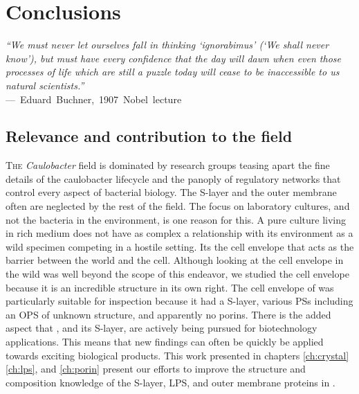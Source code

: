 
\acresetall
\resetlinenumber[1]
\chapter{Conclusions}
\label{ch:conclusions}
\begin{epigraph}
  \emph{``We must never let ourselves fall in thinking `ignorabimus' (`We shall never know'), but must have every confidence that the day will dawn when even those processes of life which are still a puzzle today will cease to be inaccessible to us natural scientists.''}\\ ---~Eduard~Buchner,~1907~Nobel~lecture 
\end{epigraph}
\section{Relevance and contribution to the field}\label{sec:relev-contr-field} 

\lettrine[lines=2]{T}{he} \textit{Caulobacter} field is dominated by research groups teasing apart the fine details of the \acl{caulobacter} lifecycle and the panoply of regulatory networks that control every aspect of bacterial biology. The \ac{S-layer}
 and the outer membrane often are neglected by the rest of the field. The focus
 on laboratory cultures, and not the bacteria in the environment, is one reason
 for this. A pure culture living in rich medium does not have as complex a
 relationship with its environment as a wild specimen competing in a hostile
 setting. Its the cell envelope that acts as the barrier between the world and
 the cell. Although looking at the \caulobacter cell envelope in the wild was well beyond the scope of this endeavor, we studied the cell envelope because it is an incredible structure in its own right. The cell envelope of \caulobacter{} was particularly suitable for inspection because it had a \acl{S-layer}, various \aclp{PS} including an \ac{OPS} of unknown structure, and apparently no porins. There is the added aspect that \caulobacter{}, and its \ac{S-layer}, are actively being pursued for biotechnology applications. This means that new findings can often be quickly be applied towards exciting biological products. This work presented in chapters \ref{ch:crystal} \ref{ch:lps}, and \ref{ch:porin} present our efforts to improve the structure and composition knowledge of the \ac{S-layer}, \ac{LPS}, and outer membrane proteins in \caulobacter{}.
 
